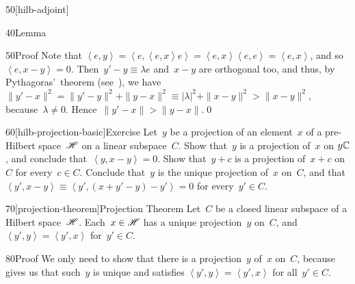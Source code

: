 \begin{parsec}{50}[hilb-adjoint]
\begin{point}{40}{Lemma}
\begin{point}{50}{Proof}
Note that $\left<e,y\right>=\left<e,\left<e,x\right>e\right>=
\left<e,x\right>\left<e,e\right>
= \left<e,x\right>$,
and so~$\left<e,x-y\right>=0$.
Then~$y'-y\equiv \lambda e$ and~$x-y$ are orthogonal too,
and thus, by Pythagoras'~theorem (see~),
we have $\|y'-x\|^2
=\|y'-y\|^2+\|y-x\|^2\equiv \left|\lambda\right|^2+\|x-y\|^2
>\|x-y\|^2$, because~$\lambda\neq 0$.
Hence~$\|y'-x\|>\|y-x\|$.\qed
\end{point}
\end{point}
\begin{point}{60}[hilb-projection-basic]{Exercise}%
Let~$y$ be a projection of an element~$x$ of a pre-Hilbert space~$\mathscr{H}$
on a linear subspace~$C$.
Show that~$y$ is a projection of~$x$ on $y\mathbb{C}$,
and conclude that~$\left<y,x-y\right>=0$.
Show that~$y+c$ is a projection of~$x+c$ on~$C$
for every~$c\in C$.
Conclude that~$y$ is the unique projection of~$x$ on~$C$,
and that~$\left<y',x-y\right>\equiv\left<y',(x+y'-y)-y'\right>=0$
for every~$y'\in C$.
\end{point}
\begin{point}{70}[projection-theorem]{Projection Theorem}%
%
Let~$C$ be a closed linear subspace
of a Hilbert space~$\mathscr{H}$.
Each~$x\in \mathscr{H}$
has a unique projection~$y$ on~$C$,
and $\left<y',y\right>=\left<y',x\right>$ for~$y'\in C$.
\begin{point}{80}{Proof}%
We only need to show that there is a projection~$y$
of~$x$ on~$C$,
because~
gives us that such~$y$ is unique and satisfies
$\left<y',y\right> = \left<y',x\right>$ for all~$y'\in C$.


\end{point}
\end{point}
\end{parsec}
